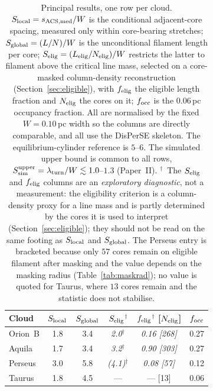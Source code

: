 \documentclass[usenatbib,twoside,twocolumn]{mnras}
\begin{document}
\begin{table}
\caption{Principal results, one row per cloud. $S_{\rm local}=s_{\rm ACS,med}/W$ is the conditional adjacent-core spacing, measured only within core-bearing stretches; $S_{\rm global}=(L/N)/W$ is the unconditional filament length per core; $S_{\rm elig}=(L_{\rm elig}/N_{\rm elig})/W$ restricts the latter to filament above the critical line mass, selected on a core-masked column-density reconstruction (Section~\ref{sec:eligible}), with $f_{\rm elig}$ the eligible length fraction and $N_{\rm elig}$ the cores on it; $f_{\rm occ}$ is the $0.06$\,pc occupancy fraction. All are normalised by the fixed $W=0.10$\,pc width so the columns are directly comparable, and all use the DisPerSE skeleton. The equilibrium-cylinder reference is $5$--$6$. The simulated upper bound is common to all rows, $S_{\rm sim}^{\rm upper}=\lambda_{\rm turn}/W\lesssim1.0$--$1.3$ (Paper~II). $^{\dagger}$~The $S_{\rm elig}$ and $f_{\rm elig}$ columns are an \emph{exploratory diagnostic}, not a measurement: the eligibility criterion is a column-density proxy for a line mass and is partly determined by the cores it is used to interpret (Section~\ref{sec:eligible}); they should not be read on the same footing as $S_{\rm local}$ and $S_{\rm global}$. The Perseus entry is bracketed because only $57$ cores remain on eligible filament after masking and the value depends on the masking radius (Table~\ref{tab:maskrad}); no value is quoted for Taurus, where $13$ cores remain and the statistic does not stabilise.}
\label{tab:principal}
\footnotesize
\setlength{\tabcolsep}{4pt}
\begin{tabular}{lccccc}
\toprule
Cloud & $S_{\rm local}$ & $S_{\rm global}$ & \emph{$S_{\rm elig}$}$^{\dagger}$ & \emph{$f_{\rm elig}$}$^{\dagger}$ [$N_{\rm elig}$] & $f_{\rm occ}$ \\
\midrule
Orion~B & 1.8 & 3.4 & \emph{2.0}$^{\dagger}$ & \emph{0.16 [268]} & 0.27 \\
Aquila  & 1.7 & 3.4 & \emph{3.2}$^{\dagger}$ & \emph{0.90 [303]} & 0.27 \\
Perseus & 3.0 & 5.8 & \emph{(4.1)}$^{\dagger}$ & \emph{0.08 [57]} & 0.12 \\
Taurus  & 1.8 & 4.5 & ---    & --- [13]   & 0.06 \\
\bottomrule
\end{tabular}
\end{table}
\end{document}
